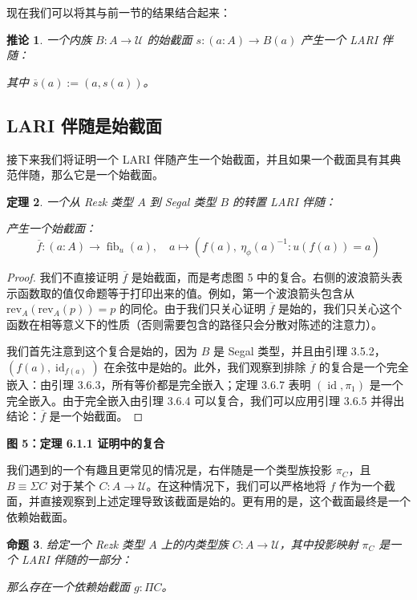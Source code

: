 \documentclass{ctexrep}
\theoremstyle{plain}
\newtheorem{theorem}{定理}[section]
\newtheorem{corollary}[theorem]{推论}
\newtheorem{proposition}[theorem]{命题}
\theoremstyle{definition}
\theoremstyle{remark}
\theoremstyle{definition}
\theoremstyle{definition}
\theoremstyle{definition}
\newcommand{\coloneqq}{\mathrel{:=}}
\newcommand{\fib}{\operatorname{fib}}
\newcommand{\id}{\operatorname{id}}
\newcommand{\UU}{\mathcal{U}}
\begin{document}
现在我们可以将其与前一节的结果结合起来：

\begin{corollary}
一个内族 $B:A\to\UU$ 的始截面 $s:(a:A)\to B(a)$ 产生一个 LARI 伴随：

其中 $\overline{s}(a) \coloneqq (a,s(a))$。
\end{corollary}

\subsection{LARI 伴随是始截面}

接下来我们将证明一个 LARI 伴随产生一个始截面，并且如果一个截面具有其典范伴随，那么它是一个始截面。

\begin{theorem}
一个从 Rezk 类型 $A$ 到 Segal 类型 $B$ 的转置 LARI 伴随：

产生一个始截面：
\[
\overline{f}:(a:A) \to \fib_u(a), \quad a \mapsto \left(f(a),\ \eta_\phi(a)^{-1}:u(f(a)) = a\right)
\]
\end{theorem}

\begin{proof}
我们不直接证明 $\overline{f}$ 是始截面，而是考虑图 5 中的复合。右侧的波浪箭头表示函数取的值仅命题等于打印出来的值。例如，第一个波浪箭头包含从 $\mathrm{rev}_A(\mathrm{rev}_A(p)) = p$ 的同伦。由于我们只关心证明 $\overline{f}$ 是始的，我们只关心这个函数在相等意义下的性质（否则需要包含的路径只会分散对陈述的注意力）。

我们首先注意到这个复合是始的，因为 $B$ 是 Segal 类型，并且由引理 3.5.2，$(f(a),\id_{f(a)})$ 在余弦中是始的。此外，我们观察到排除 $\overline{f}$ 的复合是一个完全嵌入：由引理 3.6.3，所有等价都是完全嵌入；定理 3.6.7 表明 $(\id,\pi_1)$ 是一个完全嵌入。由于完全嵌入由引理 3.6.4 可以复合，我们可以应用引理 3.6.5 并得出结论：$\overline{f}$ 是一个始截面。
\end{proof}

\begin{center}
\textbf{图 5：定理 6.1.1 证明中的复合}
\end{center}

我们遇到的一个有趣且更常见的情况是，右伴随是一个类型族投影 $\pi_C$，且 $B\equiv\Sigma C$ 对于某个 $C:A\to\UU$。在这种情况下，我们可以严格地将 $f$ 作为一个截面，并直接观察到上述定理导致该截面是始的。更有用的是，这个截面最终是一个依赖始截面。

\begin{proposition}
给定一个 Rezk 类型 $A$ 上的内类型族 $C:A\to\UU$，其中投影映射 $\pi_C$ 是一个 LARI 伴随的一部分：

那么存在一个依赖始截面 $g:\Pi C$。
\end{proposition}
\end{document}
